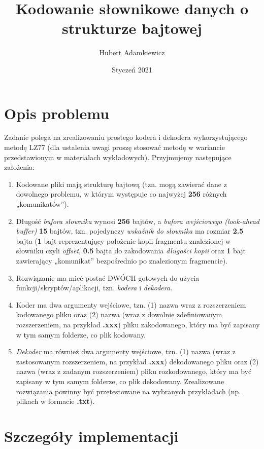 \documentclass{article}
\title{Kodowanie słownikowe danych o strukturze bajtowej}
\author{Hubert Adamkiewicz}
\date{Styczeń 2021}
\begin{document}
\maketitle

\section{Opis problemu}
\label{sec:opis_problemu}
Zadanie polega na zrealizowaniu prostego kodera i dekodera wykorzystującego metodę LZ77
(dla ustalenia uwagi proszę stosować metodę w wariancie przedstawionym w materiałach
wykładowych).
Przyjmujemy następujące założenia:
\begin{enumerate}
\item Kodowane pliki mają strukturę bajtową (tzn. mogą zawierać dane z dowolnego
problemu, w którym występuje co najwyżej \textbf{256} różnych „komunikatów”).
\item Długość \textit{bufora słownika} wynosi \textbf{256} bajtów, a \textit{bufora wejściowego (look-ahead buffer)}
\textbf{15} bajtów, tzn. pojedynczy \textit{wskaźnik do słownika} ma rozmiar \textbf{2.5} bajta (\textbf{1} bajt
reprezentujący położenie kopii fragmentu znalezionej w słowniku czyli \textit{offset}, \textbf{0.5} bajta
do zakodowania \textit{długości kopii} oraz \textbf{1} bajt zawierający „komunikat” bezpośrednio po
znalezionym fragmencie).
\item Rozwiązanie ma mieć postać DWÓCH gotowych do użycia \\ funkcji/skryptów/aplikacji,
tzn. \textit{kodera} i \textit{dekodera}.
\item Koder ma dwa argumenty wejściowe, tzn. (1) nazwa wraz z rozszerzeniem
kodowanego pliku oraz (2) nazwa (wraz z dowolnie zdefiniowanym rozszerzeniem, na
przykład \textbf{.xxx}) pliku zakodowanego, który ma być zapisany w tym samym folderze,
co plik kodowany.
\item \textit{Dekoder} ma również dwa argumenty wejściowe, tzn. (1) nazwa (wraz z zastosowanym
rozszerzeniem, na przykład \textbf{.xxx}) dekodowanego pliku oraz (2) nazwa (wraz z
zadanym rozszerzeniem) pliku rozkodowanego, który ma być zapisany w tym samym
folderze, co plik dekodowany.
Zrealizowane rozwiązania powinny być przetestowane na wybranych przykładach (np. plikach
w formacie \textbf{.txt}).
\end{enumerate}

\section{Szczegóły implementacji}
\end{document}
